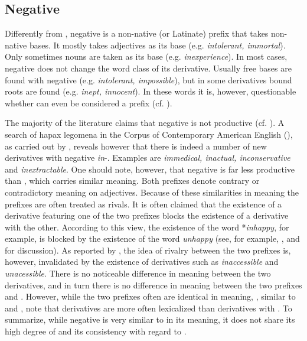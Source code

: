 \subsection{Negative  } \label{negative in}

Differently from , negative  is a non-native (or Latinate) prefix that takes non-native bases. It mostly takes adjectives as its base (e.g. \textit{intolerant, immortal}). Only sometimes nouns are taken as its base (e.g. \textit{inexperience}).  In most cases, negative  does not change the word class of its derivative.  Usually free bases are found with negative  (e.g. \textit{intolerant, impossible}), but in some derivatives bound roots are found (e.g. \textit{inept, innocent}). In these words it is, however, questionable whether  can even be considered a prefix (cf. \citealt[356f., 611]{Bauer.2013}).

The majority of the literature claims that negative  is not productive (cf. \citealt[1688]{Bauer.2002}). A search of hapax legomena in the Corpus of Contemporary American English (\citealt{Davies.20082014}), as carried out by \citet[361] {Bauer.2013}, reveals however that there is indeed a number of new derivatives with negative \textit{in}-. Examples are \textit{immedical, inactual, inconservative} and \textit{inextractable}.  One should note, however, that negative  is far less productive than , which carries similar meaning. Both prefixes denote contrary or contradictory meaning on adjectives.
 Because of these similarities in meaning the prefixes are often treated as rivals. It is often claimed that the existence of a derivative featuring one of the two prefixes blocks the existence of  a derivative with the other. According to this view, the existence of the word *\textit{inhappy}, for example, is blocked by the existence of the word \textit{unhappy} (see, for example,  \citealt[467ff.]{Jespersen.1965}, \citealt[1688f.]{Bauer.2002} and \citealt[377ff.]{Bauer.2013} for discussion).  
As reported by \citet[377]{Bauer.2013}, the idea of rivalry between the two prefixes is, however, invalidated by the existence of derivatives such as \textit{inaccessible} and \textit{unacessible}. There is no noticeable difference in meaning between the two derivatives, and in turn there is no difference in meaning between the two prefixes  and .
However, while the two prefixes often are identical in meaning, \citet[379]{Bauer.2013}, similar to  \cite{Jespersen.1965} and \cite{Bauer.2002},  note that derivatives are more often lexicalized than derivatives with . To summarize, while negative  is very similar to  in its meaning, it does not share its high degree of  and its consistency with regard to .

